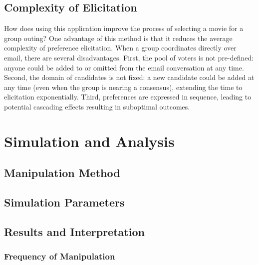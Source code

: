 \documentclass[12pt,letterpaper]{article} %
\begin{document}
\subsection{Complexity of Elicitation}

How does using this application improve the process of selecting a movie for a group outing? One advantage of this method is that it reduces the average complexity of preference elicitation. When a group coordinates directly over email, there are several disadvantages. First, the pool of voters is not pre-defined: anyone could be added to or omitted from the email conversation at any time. Second, the domain of candidates is not fixed: a new candidate could be added at any time (even when the group is nearing a consensus), extending the time to elicitation exponentially. Third, preferences are expressed in sequence, leading to potential cascading effects resulting in suboptimal outcomes. 


\section{Simulation and Analysis}


\subsection{Manipulation Method}

\subsection{Simulation Parameters}

\subsection{Results and Interpretation}

\subsubsection{Frequency of Manipulation}
\end{document}
